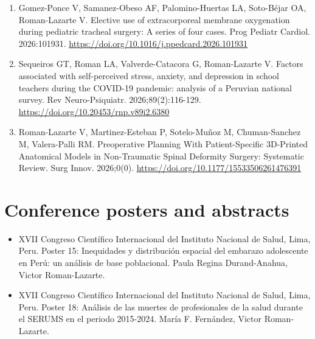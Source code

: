 \documentclass[11pt,a4paper]{article}
\begin{document}
\begin{enumerate}[leftmargin=*]
\item Gomez-Ponce V, Samanez-Obeso AF, Palomino-Huertas LA, Soto-Béjar OA, Roman-Lazarte V. Elective use of extracorporeal membrane oxygenation during pediatric tracheal surgery: A series of four cases. Prog Pediatr Cardiol. 2026:101931. \url{https://doi.org/10.1016/j.ppedcard.2026.101931}
\item Sequeiros GT, Roman LA, Valverde-Catacora G, Roman-Lazarte V. Factors associated with self-perceived stress, anxiety, and depression in school teachers during the COVID-19 pandemic: analysis of a Peruvian national survey. Rev Neuro-Psiquiatr. 2026;89(2):116-129. \url{https://doi.org/10.20453/rnp.v89i2.6380}
\item Roman-Lazarte V, Martinez-Esteban P, Sotelo-Muñoz M, Chuman-Sanchez M, Valera-Palli RM. Preoperative Planning With Patient-Specific 3D-Printed Anatomical Models in Non-Traumatic Spinal Deformity Surgery: Systematic Review. Surg Innov. 2026;0(0). \url{https://doi.org/10.1177/15533506261476391}
\end{enumerate}
\section*{Conference posters and abstracts}
\begin{itemize}[leftmargin=*,itemsep=4pt]
\item XVII Congreso Científico Internacional del Instituto Nacional de Salud, Lima, Peru. Poster 15: Inequidades y distribución espacial del embarazo adolescente en Perú: un análisis de base poblacional. Paula Regina Durand-Anahua, Victor Roman-Lazarte.
\item XVII Congreso Científico Internacional del Instituto Nacional de Salud, Lima, Peru. Poster 18: Análisis de las muertes de profesionales de la salud durante el SERUMS en el periodo 2015-2024. María F. Fernández, Victor Roman-Lazarte.
\end{itemize}
\end{document}
